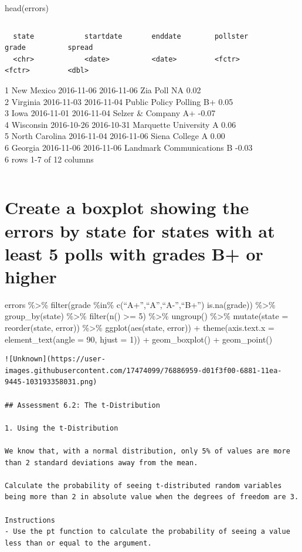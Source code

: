 \documentclass[
]{article}
\begin{document}
head(errors)

\begin{verbatim}
\end{verbatim}

\begin{verbatim}
  state            startdate       enddate        pollster                 grade          spread
  <chr>            <date>          <date>         <fctr>                   <fctr>         <dbl>
\end{verbatim}

1 New Mexico 2016-11-06 2016-11-06 Zia Poll NA 0.02\\
2 Virginia 2016-11-03 2016-11-04 Public Policy Polling B+ 0.05\\
3 Iowa 2016-11-01 2016-11-04 Selzer \& Company A+ -0.07\\
4 Wisconsin 2016-10-26 2016-10-31 Marquette University A 0.06\\
5 North Carolina 2016-11-04 2016-11-06 Siena College A 0.00\\
6 Georgia 2016-11-06 2016-11-06 Landmark Communications B -0.03\\
6 rows \textbar{} 1-7 of 12 columns

\begin{verbatim}
\end{verbatim}

\hypertarget{create-a-boxplot-showing-the-errors-by-state-for-states-with-at-least-5-polls-with-grades-b-or-higher}{%
\section{Create a boxplot showing the errors by state for states with at
least 5 polls with grades B+ or
higher}\label{create-a-boxplot-showing-the-errors-by-state-for-states-with-at-least-5-polls-with-grades-b-or-higher}}

errors \%\textgreater\% filter(grade \%in\%
c(``A+'',``A'',``A-'',``B+'') \textbar{} is.na(grade)) \%\textgreater\%
group\_by(state) \%\textgreater\% filter(n() \textgreater= 5)
\%\textgreater\% ungroup() \%\textgreater\% mutate(state =
reorder(state, error)) \%\textgreater\% ggplot(aes(state, error)) +
theme(axis.text.x = element\_text(angle = 90, hjust = 1)) +
geom\_boxplot() + geom\_point()

\begin{verbatim}
![Unknown](https://user-images.githubusercontent.com/17474099/76886959-d01f3f00-6881-11ea-9445-103193358031.png)

## Assessment 6.2: The t-Distribution

1. Using the t-Distribution

We know that, with a normal distribution, only 5% of values are more than 2 standard deviations away from the mean.

Calculate the probability of seeing t-distributed random variables being more than 2 in absolute value when the degrees of freedom are 3.

Instructions
- Use the pt function to calculate the probability of seeing a value less than or equal to the argument.
\end{verbatim}
\end{document}
